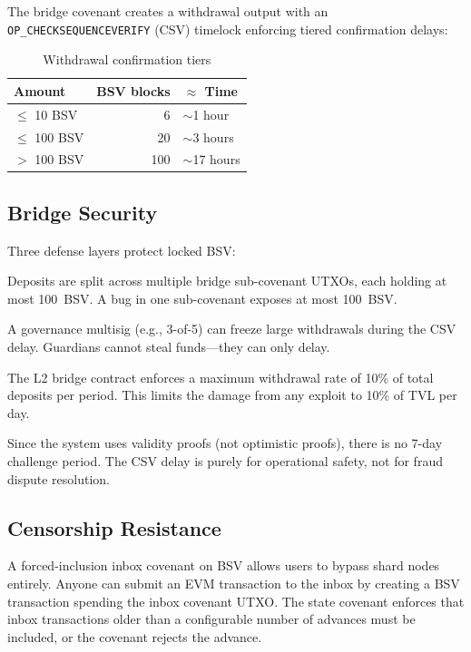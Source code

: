 \documentclass[11pt,twocolumn]{article}
\begin{document}
The bridge covenant creates a withdrawal output with an \texttt{OP\_CHECKSEQUENCEVERIFY} (CSV) timelock enforcing tiered confirmation delays:

\begin{table}[h]
\centering
\caption{Withdrawal confirmation tiers}
\label{tab:tiers}
\begin{tabular}{@{}lrl@{}}
\toprule
\textbf{Amount} & \textbf{BSV blocks} & \textbf{$\approx$ Time} \\
\midrule
$\leq$ 10 BSV & 6 & $\sim$1 hour \\
$\leq$ 100 BSV & 20 & $\sim$3 hours \\
$>$ 100 BSV & 100 & $\sim$17 hours \\
\bottomrule
\end{tabular}
\end{table}

\subsection{Bridge Security}

Three defense layers protect locked BSV:

\begin{description}[nosep,leftmargin=0em]
\item[Sharded bridge UTXOs.] Deposits are split across multiple bridge sub-covenant UTXOs, each holding at most 100~BSV. A bug in one sub-covenant exposes at most 100~BSV.
\item[Guardian freeze.] A governance multisig (e.g., 3-of-5) can freeze large withdrawals during the CSV delay. Guardians cannot steal funds---they can only delay.
\item[Rate limiting.] The L2 bridge contract enforces a maximum withdrawal rate of 10\% of total deposits per period. This limits the damage from any exploit to 10\% of TVL per day.
\end{description}

Since the system uses validity proofs (not optimistic proofs), there is no 7-day challenge period. The CSV delay is purely for operational safety, not for fraud dispute resolution.

\subsection{Censorship Resistance}

A forced-inclusion inbox covenant on BSV allows users to bypass shard nodes entirely. Anyone can submit an EVM transaction to the inbox by creating a BSV transaction spending the inbox covenant UTXO. The state covenant enforces that inbox transactions older than a configurable number of advances must be included, or the covenant rejects the advance.
\end{document}
